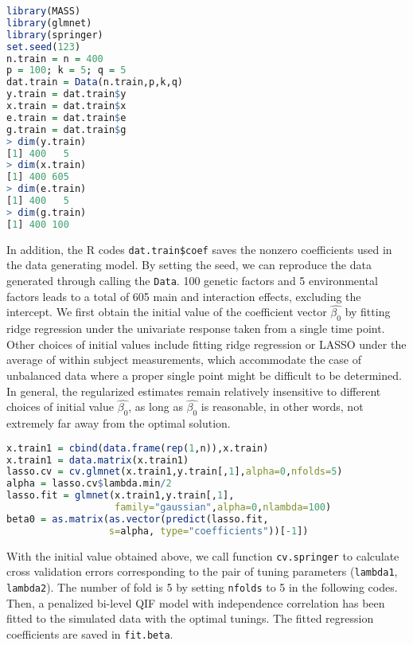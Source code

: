 \documentclass[12pt]{article}
\begin{document}
\begin{lstlisting}[language=R]
library(MASS)
library(glmnet)
library(springer)
set.seed(123)
n.train = n = 400
p = 100; k = 5; q = 5
dat.train = Data(n.train,p,k,q)
y.train = dat.train$y
x.train = dat.train$x
e.train = dat.train$e
g.train = dat.train$g
> dim(y.train)
[1] 400   5
> dim(x.train)
[1] 400 605
> dim(e.train)
[1] 400   5
> dim(g.train)
[1] 400 100
\end{lstlisting}

In addition, the R codes \texttt{dat.train\$coef} saves the nonzero coefficients used in the data generating model. By setting the seed, we can reproduce the data generated through calling the \texttt{Data}. 100 genetic factors and 5 environmental factors leads to a total of 605 main and interaction effects, excluding the intercept. We first obtain the initial value of the coefficient vector $\hat{\beta_0}$ by fitting {\color{blue} ridge regression} under the univariate response taken from a single time point. {\color{blue} Other choices of initial values include fitting ridge regression or LASSO under the average of within subject measurements, which accommodate the case of unbalanced data where a proper single point might be difficult to be determined. In general, the regularized estimates remain relatively insensitive to different choices of initial value $\hat{\beta_0}$, as long as $\hat{\beta_0}$ is reasonable, in other words, not extremely far away from the optimal solution. }


\begin{lstlisting}[language=R]
x.train1 = cbind(data.frame(rep(1,n)),x.train)
x.train1 = data.matrix(x.train1)
lasso.cv = cv.glmnet(x.train1,y.train[,1],alpha=0,nfolds=5)
alpha = lasso.cv$lambda.min/2  
lasso.fit = glmnet(x.train1,y.train[,1],
                   family="gaussian",alpha=0,nlambda=100)
beta0 = as.matrix(as.vector(predict(lasso.fit, 
                  s=alpha, type="coefficients"))[-1])
\end{lstlisting}


With the initial value obtained above, we call function \texttt{cv.springer} to calculate cross validation errors corresponding to the pair of tuning parameters (\texttt{lambda1}, \texttt{lambda2}). The number of fold is 5 by setting \texttt{nfolds} to 5 in the following codes. Then, a penalized bi-level QIF model with independence correlation has been fitted to the simulated data with the optimal tunings. The fitted regression coefficients are saved in \texttt{fit.beta}. 
\end{document}
